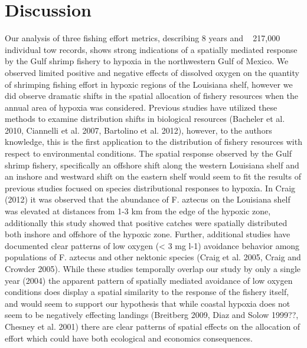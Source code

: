 \documentclass[10pt]{article}
\begin{document}
\section*{Discussion}
Our analysis of three fishing effort metrics, describing 8 years and ~ 217,000 individual tow records, shows strong indications of a spatially mediated response by the Gulf shrimp fishery to hypoxia in the northwestern Gulf of Mexico.  We observed limited positive and negative effects of dissolved oxygen on the quantity of shrimping fishing effort in hypoxic regions of the Louisiana shelf, however we did observe dramatic shifts in the spatial allocation of fishery resources when the annual area of hypoxia was considered.  Previous studies have utilized these methods to examine distribution shifts in biological resources (Bacheler et al. 2010, Ciannelli et al. 2007, Bartolino et al. 2012), however, to the authors knowledge, this is the first application to the distribution of fishery resources with respect to environmental conditions.  
The spatial response observed by the Gulf shrimp fishery, specifically an offshore shift along the western Louisiana shelf and an inshore and westward shift on the eastern shelf would seem to fit the results of previous studies focused on species distributional responses to hypoxia.  In Craig (2012) it was observed that the abundance of F. aztecus on the Louisiana shelf was elevated at distances from 1-3 km from the edge of the hypoxic zone, additionally this study showed that positive catches were spatially distributed both inshore and offshore of the hypoxic zone.  Further, additional studies have documented clear patterns of low oxygen (< 3 mg l-1) avoidance behavior among populations of F. aztecus and other nektonic species (Craig et al. 2005, Craig and Crowder 2005).  While these studies temporally overlap our study by only a single year (2004) the apparent pattern of spatially mediated avoidance of low oxygen conditions does display a spatial similarity to the response of the fishery itself, and would seem to support our hypothesis that while coastal hypoxia does not seem to be negatively effecting landings (Breitberg 2009, Diaz and Solow 1999??, Chesney et al. 2001) there are clear patterns of spatial effects on the allocation of effort which could have both ecological and economics consequences.  
\end{document}
